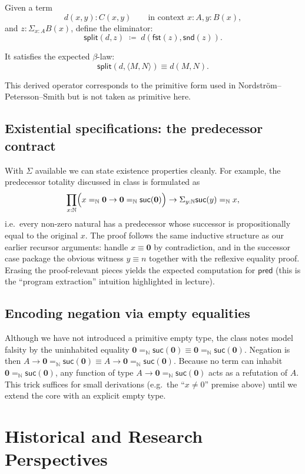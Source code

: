 \documentclass[11pt]{article}
\newcommand{\Nat}{\mathbb{N}}
\newcommand{\zero}{\mathbf{0}}
\newcommand{\suc}{\mathsf{suc}}
\newcommand{\Id}[3]{#1 =_{#2} #3}
\newcommand{\fst}{\mathsf{fst}}
\newcommand{\snd}{\mathsf{snd}}
\newcommand{\pair}[2]{\langle #1,#2\rangle}
\newcommand{\False}{\Id{\zero}{\Nat}{\suc(\zero)}}
\newcommand{\negtype}[1]{#1 \to \False}
\theoremstyle{definition}
\theoremstyle{plain}
\theoremstyle{remark}
\begin{document}
Given a term
\[
d(x,y) : C(x,y)
\qquad\text{in context } x{:}A, y{:}B(x),
\]
and $z : \Sigma_{x:A} B(x)$, define the eliminator:
\begin{equation*}
\mathsf{split}(d, z) \;\coloneqq\; d(\fst(z), \snd(z)).
\end{equation*}

It satisfies the expected $\beta$-law:
\begin{equation*}
\mathsf{split}(d, \pair{M}{N}) \equiv d(M,N).
\end{equation*}

This derived operator corresponds to the primitive form used in
Nordström–Petersson–Smith but is not taken as primitive here.


\subsection{Existential specifications: the predecessor contract}
With $\Sigma$ available we can state existence properties cleanly. For example, the predecessor totality discussed in class is formulated as
\begin{equation*}
\prod_{x:\Nat} \Bigl(\negtype{\Id{x}{\Nat}{\zero}}\Bigr) \to \Sigma_{y:\Nat} \Id{\suc(y)}{\Nat}{x},
\end{equation*}
i.e.\ every non-zero natural has a predecessor whose successor is propositionally equal to the original $x$. The proof follows the same inductive structure as our earlier recursor arguments: handle $x \equiv \zero$ by contradiction, and in the successor case package the obvious witness $y \equiv n$ together with the reflexive equality proof. Erasing the proof-relevant pieces yields the expected computation for $\mathsf{pred}$ (this is the ``program extraction'' intuition highlighted in lecture).

\subsection{Encoding negation via empty equalities}
Although we have not introduced a primitive empty type, the class notes model falsity by the uninhabited equality $\False \equiv \Id{\zero}{\Nat}{\suc(\zero)}$. Negation is then $\negtype{A} \equiv A \to \False$.
Because no term can inhabit $\False$, any function of type $A \to \False$ acts as a refutation of $A$. This trick suffices for small derivations (e.g.\ the ``$x \neq 0$'' premise above) until we extend the core with an explicit empty type.

\section{Historical and Research Perspectives}
\end{document}
